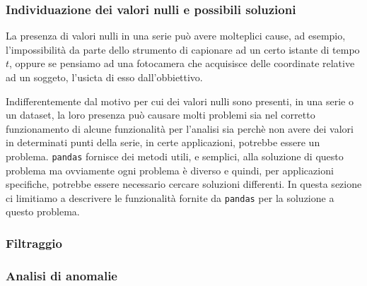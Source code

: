 \subsubsection{Individuazione dei valori nulli e possibili soluzioni}
La presenza di valori nulli in una serie può avere molteplici cause, ad esempio,
l'impossibilità da parte dello strumento di capionare ad un certo istante di tempo $t$,
oppure se pensiamo ad una fotocamera che acquisisce delle coordinate relative ad un soggeto,
l'usicta di esso dall'obbiettivo.

Indifferentemente dal motivo per cui dei valori nulli sono presenti, in una serie o un dataset,
la loro presenza può causare molti
problemi sia nel corretto funzionamento di alcune funzionalità per l'analisi sia perchè
non avere dei valori in determinati punti della serie, in certe applicazioni, potrebbe
essere un problema. \texttt{pandas} fornisce dei metodi utili, e semplici, alla soluzione di questo
problema ma ovviamente ogni problema è diverso e quindi, per applicazioni specifiche,
potrebbe essere necessario cercare soluzioni differenti. In questa sezione ci limitiamo
a descrivere le funzionalità fornite da \texttt{pandas} per la soluzione a questo problema.





\subsubsection{Filtraggio}
\subsubsection{Analisi di anomalie}


